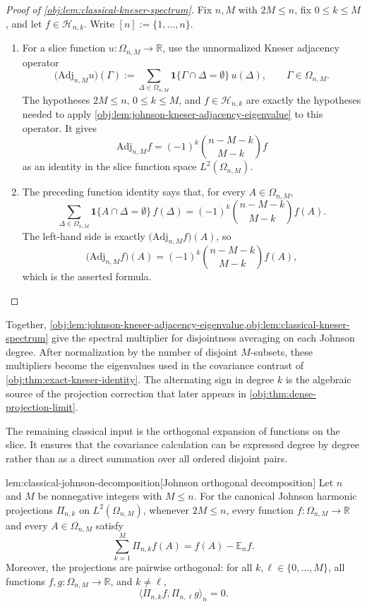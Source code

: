 \documentclass[11pt]{article}
\begin{document}
\begin{proof}[Proof of \cref{obj:lem:classical-kneser-spectrum}]
Fix \(n,M\) with \(2M\le n\), fix \(0\le k\le M\), and let
\(f\in\mathcal H_{n,k}\).  Write \([n]:=\{1,\ldots,n\}\).

\begin{enumerate}
\item For a slice function \(u:\Omega_{n,M}\to\mathbb R\), use the unnormalized
Kneser adjacency operator
\[
\bigl(\mathrm{Adj}_{n,M}u\bigr)(\Gamma)
:=
\sum_{\Delta\in\Omega_{n,M}}
\mathbf 1\{\Gamma\cap\Delta=\emptyset\}\,u(\Delta),
\qquad \Gamma\in\Omega_{n,M}.
\]
The hypotheses \(2M\le n\), \(0\le k\le M\), and
\(f\in\mathcal H_{n,k}\) are exactly the hypotheses needed to apply
\cref{obj:lem:johnson-kneser-adjacency-eigenvalue} to this operator.  It gives
\[
\mathrm{Adj}_{n,M}f
=
(-1)^k\binom{n-M-k}{M-k}f
\]
as an identity in the slice function space \(L^2(\Omega_{n,M})\). %

\item The preceding function identity says that, for every
\(A\in\Omega_{n,M}\),
\[
\sum_{\Delta\in\Omega_{n,M}}
\mathbf 1\{A\cap\Delta=\emptyset\}\,f(\Delta)
=
(-1)^k\binom{n-M-k}{M-k}f(A).
\]
The left-hand side is exactly \(\bigl(\mathrm{Adj}_{n,M}f\bigr)(A)\), so
\[
\bigl(\mathrm{Adj}_{n,M} f\bigr)(A)
=
(-1)^k \binom{n-M-k}{M-k} f(A),
\]
which is the asserted formula. %
\end{enumerate}
\end{proof}

Together, \cref{obj:lem:johnson-kneser-adjacency-eigenvalue,obj:lem:classical-kneser-spectrum} give the spectral multiplier for disjointness averaging on each Johnson degree. After normalization by the number of disjoint \(M\)-subsets, these multipliers become the eigenvalues used in the covariance contrast of \cref{obj:thm:exact-kneser-identity}. The alternating sign in degree \(k\) is the algebraic source of the projection correction that later appears in \cref{obj:thm:dense-projection-limit}.

The remaining classical input is the orthogonal expansion of functions on the slice. It ensures that the covariance calculation can be expressed degree by degree rather than as a direct summation over all ordered disjoint pairs.

\begin{lemmav}{lem:classical-johnson-decomposition}[Johnson orthogonal decomposition]
Let \(n\) and \(M\) be nonnegative integers with \(M\le n\). For the canonical Johnson harmonic projections \(\Pi_{n,k}\) on \(L^2(\Omega_{n,M})\), whenever \(2M\le n\), every function \(f:\Omega_{n,M}\to\mathbb R\) and every \(A\in\Omega_{n,M}\) satisfy
\[
\sum_{k=1}^{M}\Pi_{n,k}f(A)
=
f(A)-\mathbb E_n f .
\]
Moreover, the projections are pairwise orthogonal: for all \(k,\ell\in\{0,\ldots,M\}\), all functions \(f,g:\Omega_{n,M}\to\mathbb R\), and \(k\ne \ell\),
\[
\langle \Pi_{n,k}f,\Pi_{n,\ell}g\rangle_n=0 .
\]
\end{lemmav}
\end{document}
